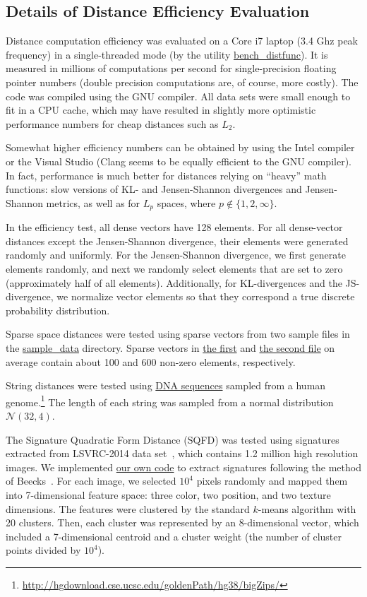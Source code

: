 \documentclass[runningheads,a4paper]{llncs}
\newcommand{\replocfile}{https://github.com/searchivarius/NonMetricSpaceLib/blob/develop/}
\begin{document}
{\subsection{Details of Distance Efficiency Evaluation}\label{SectionDistEvalDetails}
Distance computation efficiency was evaluated on a Core i7 laptop (3.4 Ghz peak frequency)
in a single-threaded mode (by the utility \href{\replocfile similarity_search/test/bench_distfunc.cc}{bench\_distfunc}).
It is measured in millions of computations per second for single-precision
floating pointer numbers (double precision computations are, of course, more costly). 
The code was compiled using the GNU compiler. 
All data sets were small enough to fit in a CPU cache, which may have resulted in slightly more optimistic
performance numbers for cheap distances such as $L_2$.

Somewhat higher efficiency numbers can be obtained by using the Intel compiler
or the Visual Studio (Clang seems to be equally efficient to the GNU compiler).
In fact, performance is much better for distances relying on ``heavy'' math functions:
slow versions of KL- and Jensen-Shannon divergences and Jensen-Shannon metrics, 
as well as for $L_p$ spaces,
where $p \not\in\{1,2,\infty\}$.

In the efficiency test, all dense vectors have 128 elements.
For all dense-vector distances except the Jensen-Shannon divergence,
their elements were generated randomly and uniformly.
For the Jensen-Shannon divergence, we first generate elements randomly,
and next we randomly select elements that are set to zero (approximately half of all elements). 
Additionally, for KL-divergences and the JS-divergence,
we normalize vector elements so that they correspond a true discrete probability distribution. 

Sparse space distances were tested using sparse vectors from two sample files in the
\href{\replocfile sample_data}{sample\_data} directory.
Sparse vectors in 
\href{\replocfile sample_data/sparse_5K.txt}{the first} 
and
\href{\replocfile sample_data/sparse_wiki_5K.txt}{the second file} on average contain
about 100 and 600 non-zero elements, respectively.

String distances were tested using \href{\replocfile sample_data/dna32_4_5K.txt}{DNA sequences} sampled from a human genome.\footnote{\url{http://hgdownload.cse.ucsc.edu/goldenPath/hg38/bigZips/}}
The length of each string was sampled from a normal distribution $\mathcal{N}(32,4)$. 

The Signature Quadratic Form Distance (SQFD) \cite{Beecks:2010,Beecks:2013} was tested 
using signatures extracted from LSVRC-2014 data set~\cite{ILSVRCarxiv14}, 
which contains 1.2 million high resolution images.
We implemented \href{\replocfile data/data\_conv/sqfd}{our own code} to extract signatures following the method of Beecks~\cite{Beecks:2013}.
For each image, we selected $10^4$ pixels randomly and
mapped them into 7-dimensional feature space:
three color, two position, and two texture dimensions.
The features were clustered by the standard $k$-means algorithm with 20 clusters.
Then, each cluster was represented by an 8-dimensional vector, which included
a 7-dimensional centroid and a cluster weight (the number of cluster points divided
by $10^4$).

}
\end{document}
